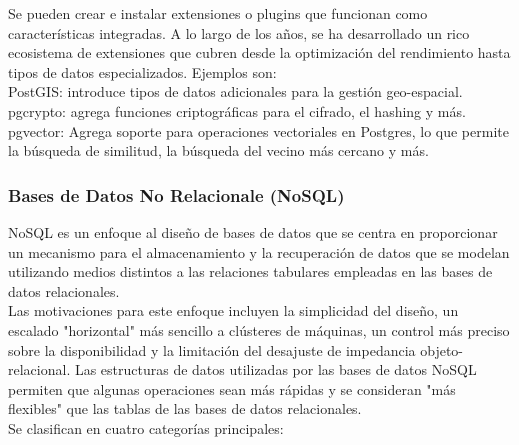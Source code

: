 \documentclass[12pt]{book}
\begin{document}
\begin{itemize}
Se pueden crear e instalar extensiones o plugins que funcionan como características integradas. A lo largo de los años, se ha desarrollado un rico ecosistema de extensiones que cubren desde la optimización del rendimiento hasta tipos de datos especializados. Ejemplos son:\\
PostGIS: introduce tipos de datos adicionales para la gestión geo-espacial.\\
pgcrypto: agrega funciones criptográficas para el cifrado, el hashing y más.\\
pgvector: Agrega soporte para operaciones vectoriales en Postgres, lo que permite la búsqueda de similitud, la búsqueda del vecino más cercano y más.\\
\end{itemize}

\subsubsection{Bases de Datos No Relacionale (NoSQL)} %
NoSQL es un enfoque al diseño de bases de datos que se centra en proporcionar un mecanismo para el almacenamiento y la recuperación de datos que se modelan utilizando medios distintos a las relaciones tabulares empleadas en las bases de datos relacionales.\\
Las motivaciones para este enfoque incluyen la simplicidad del diseño, un escalado "horizontal" más sencillo a clústeres de máquinas, un control más preciso sobre la disponibilidad y la limitación del desajuste de impedancia objeto-relacional. Las estructuras de datos utilizadas por las bases de datos NoSQL permiten que algunas operaciones sean más rápidas y se consideran "más flexibles" que las tablas de las bases de datos relacionales.\\
Se clasifican en cuatro categorías principales:
\end{document}
